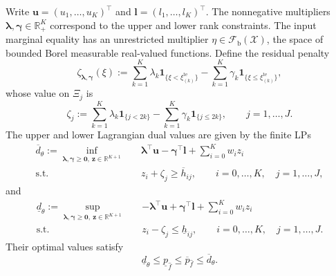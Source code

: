 \begin{lemma}
  \label{lem-weak-duality}
  Write $\bm u=(u_1,\ldots,u_K)^\top$ and $\bm l=(l_1,\ldots,l_K)^\top$. The nonnegative multipliers $\bm\lambda,\bm\gamma\in\mathbb R_+^K$ correspond to the upper and lower rank constraints. The input marginal equality has an unrestricted multiplier $\eta\in\mathcal F_{\mathrm b}(\mathcal X)$, the space of bounded Borel measurable real-valued functions. Define the residual penalty
  \begin{equation}
    \zeta_{\bm\lambda,\bm\gamma}(\xi)
    :=\sum_{k=1}^{K}\lambda_k\mathbf1_{\{\xi<\xi_{(k)}^{\mathrm{te}}\}}
      -\sum_{k=1}^{K}\gamma_k\mathbf1_{\{\xi\le\xi_{(k)}^{\mathrm{te}}\}},
    \label{eq-dual-step-function}
  \end{equation}
  whose value on $\Xi_j$ is
  \begin{equation}
    \zeta_j:=\sum_{k=1}^{K}\lambda_k\mathbf1_{\{j<2k\}}
      -\sum_{k=1}^{K}\gamma_k\mathbf1_{\{j\le2k\}},
    \qquad j=1,\ldots,J.
    \label{eq-dual-cell-values}
  \end{equation}
  The upper and lower Lagrangian dual values are given by the finite LPs
  \begin{equation}
    \begin{aligned}
      \overline d_\theta
      :=\inf_{\bm\lambda,\bm\gamma\ge\bm0,\ \bm z\in\mathbb R^{K+1}}\quad&
        \bm\lambda^\top\bm u-\bm\gamma^\top\bm l+\sum_{i=0}^{K}w_i z_i\\
      \text{s.t.}\quad&z_i+\zeta_j\ge\overline h_{ij},
        \qquad i=0,\ldots,K,\quad j=1,\ldots,J,
    \end{aligned}
    \label{eq-finite-upper-dual}
  \end{equation}
  and
  \begin{equation}
    \begin{aligned}
      \underline d_\theta
      :=\sup_{\bm\lambda,\bm\gamma\ge\bm0,\ \bm z\in\mathbb R^{K+1}}\quad&
        -\bm\lambda^\top\bm u+\bm\gamma^\top\bm l+\sum_{i=0}^{K}w_i z_i\\
      \text{s.t.}\quad&z_i-\zeta_j\le\underline h_{ij},
        \qquad i=0,\ldots,K,\quad j=1,\ldots,J.
    \end{aligned}
    \label{eq-finite-lower-dual}
  \end{equation}
  Their optimal values satisfy
  \begin{equation}
    \underline d_\theta\le\underline p_{\hat f}
      \le\overline p_{\hat f}\le\overline d_\theta.
    \label{eq-weak-duality}
  \end{equation}
\end{lemma}
